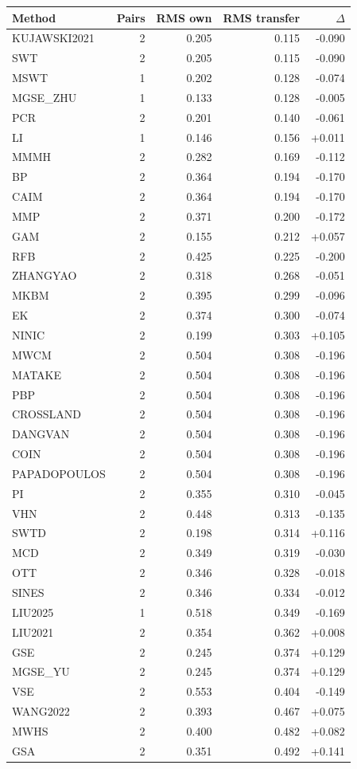 \begin{tabular}{lrrrr}
\hline
Method & Pairs & RMS own & RMS transfer & $\Delta$ \\
\hline
KUJAWSKI2021 & 2 & 0.205 & 0.115 & -0.090 \\
SWT & 2 & 0.205 & 0.115 & -0.090 \\
MSWT & 1 & 0.202 & 0.128 & -0.074 \\
MGSE_ZHU & 1 & 0.133 & 0.128 & -0.005 \\
PCR & 2 & 0.201 & 0.140 & -0.061 \\
LI & 1 & 0.146 & 0.156 & +0.011 \\
MMMH & 2 & 0.282 & 0.169 & -0.112 \\
BP & 2 & 0.364 & 0.194 & -0.170 \\
CAIM & 2 & 0.364 & 0.194 & -0.170 \\
MMP & 2 & 0.371 & 0.200 & -0.172 \\
GAM & 2 & 0.155 & 0.212 & +0.057 \\
RFB & 2 & 0.425 & 0.225 & -0.200 \\
ZHANGYAO & 2 & 0.318 & 0.268 & -0.051 \\
MKBM & 2 & 0.395 & 0.299 & -0.096 \\
EK & 2 & 0.374 & 0.300 & -0.074 \\
NINIC & 2 & 0.199 & 0.303 & +0.105 \\
MWCM & 2 & 0.504 & 0.308 & -0.196 \\
MATAKE & 2 & 0.504 & 0.308 & -0.196 \\
PBP & 2 & 0.504 & 0.308 & -0.196 \\
CROSSLAND & 2 & 0.504 & 0.308 & -0.196 \\
DANGVAN & 2 & 0.504 & 0.308 & -0.196 \\
COIN & 2 & 0.504 & 0.308 & -0.196 \\
PAPADOPOULOS & 2 & 0.504 & 0.308 & -0.196 \\
PI & 2 & 0.355 & 0.310 & -0.045 \\
VHN & 2 & 0.448 & 0.313 & -0.135 \\
SWTD & 2 & 0.198 & 0.314 & +0.116 \\
MCD & 2 & 0.349 & 0.319 & -0.030 \\
OTT & 2 & 0.346 & 0.328 & -0.018 \\
SINES & 2 & 0.346 & 0.334 & -0.012 \\
LIU2025 & 1 & 0.518 & 0.349 & -0.169 \\
LIU2021 & 2 & 0.354 & 0.362 & +0.008 \\
GSE & 2 & 0.245 & 0.374 & +0.129 \\
MGSE_YU & 2 & 0.245 & 0.374 & +0.129 \\
VSE & 2 & 0.553 & 0.404 & -0.149 \\
WANG2022 & 2 & 0.393 & 0.467 & +0.075 \\
MWHS & 2 & 0.400 & 0.482 & +0.082 \\
GSA & 2 & 0.351 & 0.492 & +0.141 \\
\hline
\end{tabular}
